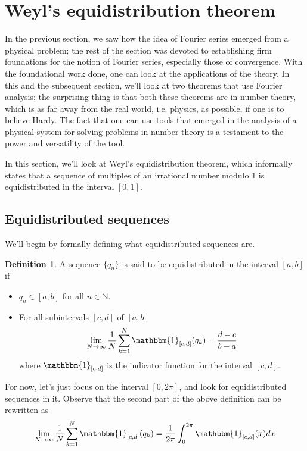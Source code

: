 \documentclass[12pt, titlepage]{article}
\theoremstyle{definition}
\newtheorem{defn}{Definition}[section]
\begin{document}
\section{Weyl's equidistribution theorem}
In the previous section, we saw how the idea of Fourier series emerged from a physical problem; the rest of the section was devoted to establishing firm foundations for the notion of Fourier series, especially those of convergence. With the foundational work done, one can look at the applications of the theory. In this and the subsequent section, we'll look at two theorems that use Fourier analysis; the surprising thing is that both these theorems are in number theory, which is as far away from the real world, i.e. physics, as possible, if one is to believe Hardy. The fact that one can use tools that emerged in the analysis of a physical system for solving problems in number theory is a testament to the power and versatility of the tool.

In this section, we'll look at Weyl's equidistribution theorem, which informally states that a sequence of multiples of an irrational number modulo $1$ is equidistributed in the interval $[0,1]$.

\subsection{Equidistributed sequences}
We'll begin by formally defining what equidistributed sequences are.
\begin{defn}
    A sequence $\{q_n\}$ is said to be equidistributed in the interval $[a,b]$ if
    \begin{itemize}
        \item $q_n \in [a,b]$ for all $n \in \mathbb{N}$.
        \item For all subintervals $[c,d]$ of $[a,b]$
                \begin{align*}
                    \lim_{N \to \infty} \frac{1}{N} \sum_{k=1}^{N} \mathbbm{1}_{[c,d]}(q_k) = \frac{d-c}{b-a}
                \end{align*}
                where $\mathbbm{1}_{[c,d]}$ is the indicator function for the interval $[c,d]$.
    \end{itemize}
\end{defn}
For now, let's just focus on the interval $[0,2\pi]$, and look for equidistributed sequences in it. Observe that the second part of the above definition can be rewritten as
\begin{align}
    \lim\limits_{N \to \infty} \frac{1}{N} \sum_{k=1}^{N} \mathbbm{1}_{[c,d]}(q_k) = \frac{1}{2\pi} \int_{0}^{2\pi} \mathbbm{1}_{[c,d]}(x) dx \label{eq:6}
\end{align}
\end{document}
